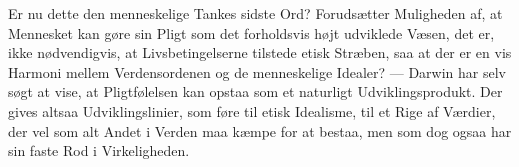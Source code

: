 \documentclass[12pt,a4paper,openany]{book}
\begin{document}
Er nu dette den menneskelige Tankes sidste Ord? Forudsætter
Muligheden af, at Mennesket kan gøre sin Pligt som
det forholdsvis højt udviklede Væsen, det er, ikke nødvendigvis,
at Livsbetingelserne tilstede etisk Stræben, saa at der er en
vis Harmoni mellem Verdensordenen og de menneskelige Idealer?
--- Darwin har selv søgt at vise, at Pligtfølelsen kan opstaa
som et naturligt Udviklingsprodukt. Der gives altsaa Udviklingslinier,
som føre til etisk Idealisme, til et Rige af Værdier,
der vel som alt Andet i Verden maa kæmpe for at bestaa,
men som dog ogsaa har sin faste Rod i Virkeligheden.
\end{document}
